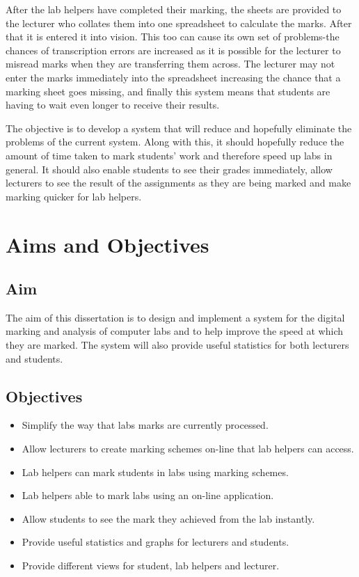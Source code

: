 \documentclass[12pt]{article}  %
\begin{document}
After the lab helpers have completed their marking, the sheets are provided to the lecturer who collates them into one spreadsheet to calculate the marks. After that it is entered it into vision. This too can cause its own set of problems-the chances of transcription errors are increased as it is possible for the lecturer to misread marks when they are transferring them across. The lecturer may not enter the marks immediately into the spreadsheet increasing the chance that a marking sheet goes missing, and finally this system means that students are having to wait even longer to receive their results.

The objective is to develop a system that will reduce and hopefully eliminate the problems of the current system. Along with this, it should hopefully reduce the amount of time taken to mark students’ work and therefore speed up labs in general. It should also enable students to see their grades immediately, allow lecturers to see the result of the assignments as they are being marked and make marking quicker for lab helpers.




\newpage
\section{Aims and Objectives}
\subsection{Aim}
The aim of this dissertation is to design and implement a system for the digital marking and analysis of computer labs and to help improve the speed at which they are marked. The system will also provide useful statistics for both lecturers and students.

\subsection{Objectives}
\label{section:object}
\begin{itemize}
\item Simplify the way that labs marks are currently processed.
\item Allow lecturers to create marking schemes on-line that lab helpers can access. 
\item Lab helpers can mark students in labs using marking schemes.
\item Lab helpers able  to mark labs using an on-line application.
\item Allow students to see the mark they achieved from the lab instantly.
\item Provide useful statistics and graphs for lecturers and students.
\item Provide different views for student, lab helpers and lecturer.
\end{itemize}
\end{document}
